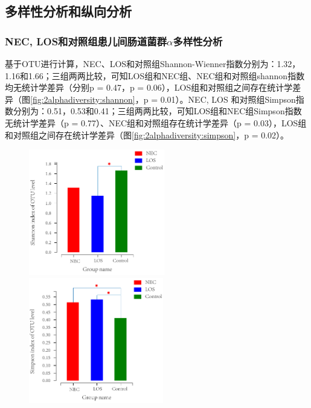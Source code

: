 {{  %
  \subsection{多样性分析和纵向分析}
    \subsubsection{NEC, LOS和对照组患儿间肠道菌群$\alpha$多样性分析}
      基于OTU进行计算，NEC、LOS和对照组Shannon-Wienner指数分别为：1.32，1.16和1.66；三组两两比较，可知LOS组和NEC组、NEC组和对照组shannon指数均无统计学差异（分别p = 0.47，p = 0.06），LOS组和对照组之间存在统计学差异（图\ref{fig:2alphadiversity:shannon}，p = 0.01）。NEC, LOS 和对照组Simpson指数分别为：0.51，0.53和0.41；三组两两比较，可知LOS组和NEC组Simpson指数无统计学差异（p = 0.77）、NEC组和对照组存在统计学差异（p = 0.03），LOS组和对照组之间存在统计学差异（图\ref{fig:2alphadiversity:simpson}，p = 0.02）。
      \begin{figure}[!htp]
        \centering
            {\includegraphics[height=5.5cm]{figure/2shannon.pdf}}
            \hspace{4em}
            {\includegraphics[height=5.5cm]{figure/2simpson.pdf}}
        \label{fig:2alphadiversity}
      \end{figure}
}}
